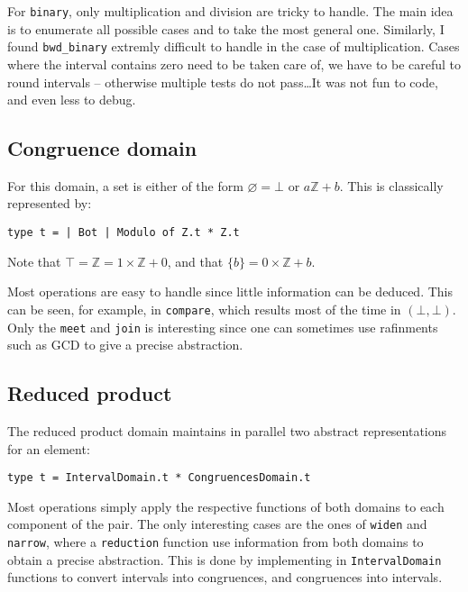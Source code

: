 \documentclass[12pt,a4paper]{article}
\begin{document}
For \texttt{binary}, only multiplication and division are tricky to handle. The main idea is to enumerate all possible cases and to take the most general one. Similarly, I found \texttt{bwd\_binary} extremly difficult to handle in the case of multiplication. Cases where the interval contains zero need to be taken care of, we have to be careful to round intervals -- otherwise multiple tests do not pass\dots It was not fun to code, and even less to debug.

\subsection{Congruence domain}
For this domain, a set is either of the form $\varnothing=\bot$ or $a\mathbb{Z}+b$. This is classically represented by:
\begin{center}
    \texttt{type t = | Bot | Modulo of Z.t * Z.t}
\end{center}
Note that $\top=\mathbb{Z}=1\times\mathbb{Z}+0$, and that $\{b\}=0\times\mathbb{Z}+b$.

Most operations are easy to handle since little information can be deduced. This can be seen, for example, in \texttt{compare}, which results most of the time in $(\bot, \bot)$. Only the \texttt{meet} and \texttt{join} is interesting since one can sometimes use rafinments such as GCD to give a precise abstraction.

\subsection{Reduced product}
The reduced product domain maintains in parallel two abstract representations for an element:
\begin{center}
    \texttt{type t = IntervalDomain.t * CongruencesDomain.t}
\end{center}
Most operations simply apply the respective functions of both domains to each component of the pair. The only interesting cases are the ones of \texttt{widen} and \texttt{narrow}, where a \texttt{reduction} function use information from both domains to obtain a precise abstraction. This is done by implementing in \texttt{IntervalDomain} functions to convert intervals into congruences, and congruences into intervals.
\end{document}
